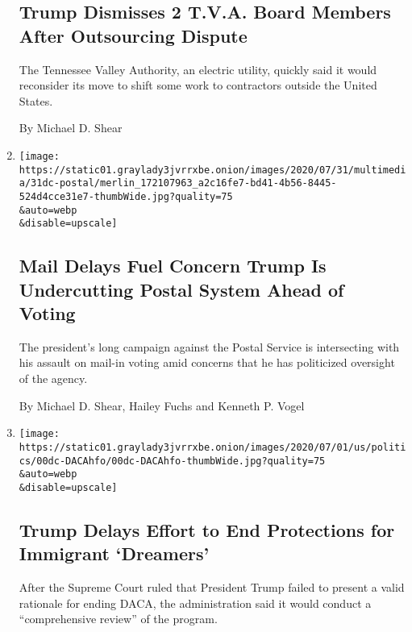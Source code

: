 \begin{enumerate}
  \hypertarget{trump-dismisses-2-tva-board-members-after-outsourcing-dispute}{%
  \subsection{Trump Dismisses 2 T.V.A. Board Members After Outsourcing
  Dispute}\label{trump-dismisses-2-tva-board-members-after-outsourcing-dispute}}

  The Tennessee Valley Authority, an electric utility, quickly said it
  would reconsider its move to shift some work to contractors outside
  the United States.

  By Michael D. Shear
\item
  \href{/2020/07/31/us/politics/trump-usps-mail-delays.html}{}

  \texttt{[image: https://static01.graylady3jvrrxbe.onion/images/2020/07/31/multimedia/31dc-postal/merlin\_172107963\_a2c16fe7-bd41-4b56-8445-524d4cce31e7-thumbWide.jpg?quality=75\\\&auto=webp\\\&disable=upscale]}

  \hypertarget{mail-delays-fuel-concern-trump-is-undercutting-postal-system-ahead-of-voting}{%
  \subsection{Mail Delays Fuel Concern Trump Is Undercutting Postal
  System Ahead of
  Voting}\label{mail-delays-fuel-concern-trump-is-undercutting-postal-system-ahead-of-voting}}

  The president's long campaign against the Postal Service is
  intersecting with his assault on mail-in voting amid concerns that he
  has politicized oversight of the agency.

  By Michael D. Shear, Hailey Fuchs and Kenneth P. Vogel
\item
  \href{/2020/07/28/us/politics/trump-daca.html}{}

  \texttt{[image: https://static01.graylady3jvrrxbe.onion/images/2020/07/01/us/politics/00dc-DACAhfo/00dc-DACAhfo-thumbWide.jpg?quality=75\\\&auto=webp\\\&disable=upscale]}

  \hypertarget{trump-delays-effort-to-end-protections-for-immigrant-dreamers}{%
  \subsection{Trump Delays Effort to End Protections for Immigrant
  `Dreamers'}\label{trump-delays-effort-to-end-protections-for-immigrant-dreamers}}

  After the Supreme Court ruled that President Trump failed to present a
  valid rationale for ending DACA, the administration said it would
  conduct a ``comprehensive review'' of the program.


\end{enumerate}
